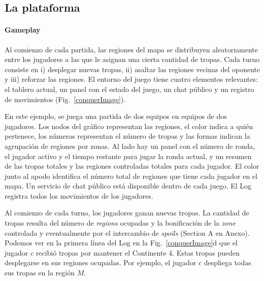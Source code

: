 \documentclass[a4paper,11pt]{book}
\theoremstyle{definition}
\begin{document}
\subsection{La plataforma}

\paragraph{Gameplay}\label{sub:gameplay}

Al comienzo de cada partida, las regiones del mapa se distribuyen aleatoriamente entre los jugadores a las que le asignan una cierta cantidad de tropas.
%
Cada turno consiste en i) desplegar nuevas tropas, ii) asaltar las regiones vecinas del oponente y iii) reforzar las regiones.
%
El entorno del juego tiene cuatro elementos relevantes: el tablero actual, un panel con el estado del juego, un chat público y un registro de movimientos (Fig.~\ref{conquerImage}).


En este ejemplo, se juega una partida de dos equipos en equipos de dos jugadores.
%
Los nodos del gráfico representan las regiones, el color indica a quién pertenece, los números representan el número de tropas y las formas indican la agrupación de regiones por zonas.
%
Al lado hay un panel con el número de ronda, el jugador activo y el tiempo restante para jugar la ronda actual, y un resumen de las tropas totales y las regiones controladas totales para cada jugador.
%
El color junto al apodo identifica el número total de regiones que tiene cada jugador en el mapa.
%
Un servicio de chat público está disponible dentro de cada juego.
%
El Log registra todos los movimientos de los jugadores.


Al comienzo de cada turno, los jugadores ganan nuevas tropas.
%
La cantidad de tropas resulta del número de \emph{regions} ocupadas y la bonificación de la \emph{zone} controlada y eventualmente por el intercambio de \emph{spoils} (Section A en Anexo).
%
Podemos ver en la primera línea del Log en la Fig.~\ref{conquerImage}d que el jugador $c$ recibió tropas por mantener el Continente 4.
%
Estas tropas pueden desplegarse en sus regiones ocupadas.
%
Por ejemplo, el jugador $c$ despliega todas sus tropas en la región $M$.

\end{document}
